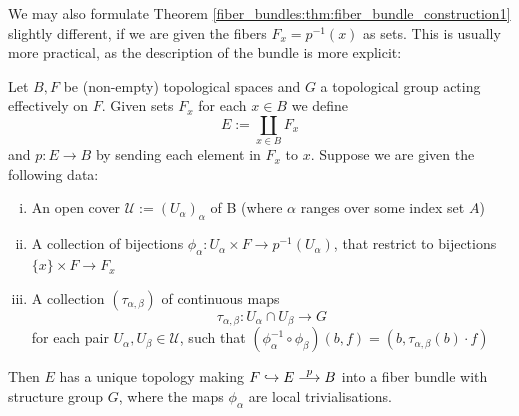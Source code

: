     \needspace{5em}
     We may also formulate Theorem \ref{fiber_bundles:thm:fiber_bundle_construction1} slightly different, if we are given the fibers $F_x = p^{-1}(x)$ as sets. This is usually more practical, as the description of the bundle is more explicit:

     \begin{theorem}
        \label{thm:fiber_bundle_construction2}
        Let $B,F$ be (non-empty) topological spaces and $G$ a topological group acting effectively on $F$. Given sets $F_x$ for each $x \in B$ we define $$E := \coprod_{x \in B}F_x$$ and $p \colon E \to B$ by sending each element in $F_x$ to $x$. Suppose we are given the following data:
        \begin{enumerate}[(i)]
            \item An open cover $\mathcal{U} := (U_\alpha)_\alpha$ of B (where $\alpha$ ranges over some index set $A$)
            \item A collection of bijections $\phi_\alpha \colon U_\alpha \times F \to p^{-1}(U_\alpha)$, that restrict to bijections $\{x\} \times F \to F_x$
            \item  A collection $(\tau_{\alpha,\beta})$ of continuous maps
            \[
            \tau_{\alpha,\beta} \colon U_\alpha \cap U_\beta \to G
            \]
            for each pair $U_\alpha,U_\beta \in \mathcal{U}$, such that $(\phi_\alpha^{-1} \circ \phi_\beta)(b,f) = (b,\tau_{\alpha,\beta}(b) \cdot f)$
        \end{enumerate}
        Then $E$ has a unique topology making $F \hookrightarrow E \oset[0.6pt]{\scalebox{0.8}{$p$}}{\longrightarrow} B$ into a fiber bundle with structure group $G$, where the maps $\phi_\alpha$ are local trivialisations.
     \end{theorem}
